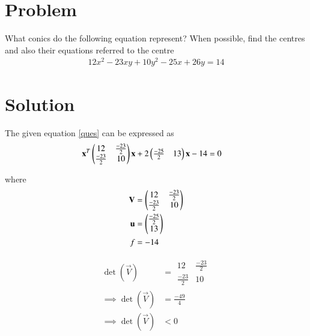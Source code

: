 \documentclass[journal,12pt,twocolumn]{IEEEtran}
\begin{document}
\section{Problem}
%
What conics do the following equation represent? When possible, find the centres and also their equations referred to the centre
\begin{align}
12x^2-23xy+10y^2-25x+26y=14\label{ques}
\end{align}

\section{Solution }
The given equation \eqref{ques} can be expressed as 
\begin{align}
&\mathbf{x}^T\begin{pmatrix}12 & \frac{-23}{2}\\\frac{-23}{2} & 10\end{pmatrix}\mathbf{x}+2\begin{pmatrix}\frac{-25}{2} & 13\end{pmatrix}\mathbf{x}-14=0\label{given}
\end{align}

where 
\begin{align}
\mathbf{V}&=\begin{pmatrix}12 & \frac{-23}{2}\\\frac{-23}{2} & 10\end{pmatrix}\\
\mathbf{u}&=\begin{pmatrix}\frac{-25}{2} \\ 13\end{pmatrix}\\
f&=-14
\end{align}

\begin{align}
    \det(\vec{V})&=\begin{array}{|cc|}
12 & \frac{-23}{2}\\\frac{-23}{2} & 10
\end{array}\\
\implies\det(\vec{V})&=\frac{-49}{4}\\
\implies\det(\vec{V})&<0
\end{align}
\end{document}

